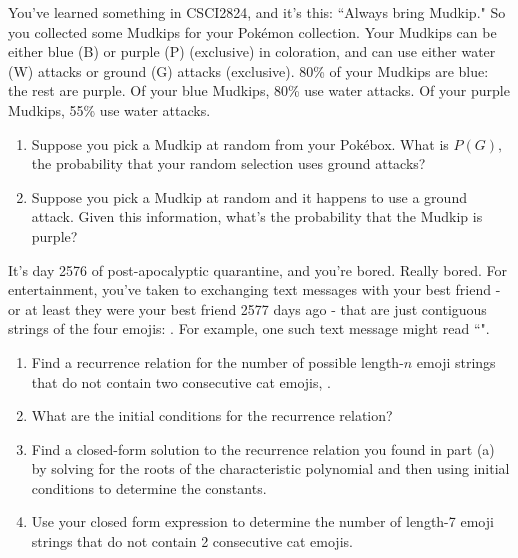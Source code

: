 \documentclass[11pt]{amsart}
\newcommand{\be}{\begin{enumerate}}
\newcommand{\ee}{\end{enumerate}}
\begin{document}
\item You've learned something in CSCI2824, and it's this: ``Always bring Mudkip."  So you collected some Mudkips for your Pok\'emon collection.  Your Mudkips can be either blue (B) or purple (P) (exclusive) in coloration, and can use either water (W) attacks or ground (G) attacks (exclusive).  80\% of your Mudkips are blue: the rest are purple.  Of your blue Mudkips, 80\% use water attacks.  Of your purple Mudkips, 55\% use water attacks.
\be
\item Suppose you pick a Mudkip at random from your Pok\'ebox.  What is $P(G),$ the probability that your random selection uses ground attacks?
\item Suppose you pick a Mudkip at random and it happens to use a ground attack.  Given this information, what's the probability that the Mudkip is purple?
\ee
	\begin{sol}
	\end{sol}

\item It's day 2576 of post-apocalyptic quarantine, and you're bored.  Really bored.  For entertainment, you've taken to exchanging text messages with your best friend - or at least they were your best friend 2577 days ago - that are just contiguous strings of the four emojis: {\LARGE \Winkey \Innocey \Cat \Coffeecup}.  For example, one such text message might read ``\Cat \Coffeecup \Winkey \Coffeecup \Innocey \Cat".
\be
\item Find a recurrence relation for the number of possible length-$n$ emoji strings that do not contain two consecutive cat emojis, {\LARGE\Cat\Cat}.
\item What are the initial conditions for the recurrence relation?
\item Find a closed-form solution to the recurrence relation you found in part (a) by solving for the roots of the characteristic polynomial and then using initial conditions to determine the constants.
\item Use your closed form expression to determine the number of length-7 emoji strings that do not contain 2 consecutive cat emojis.
\ee
\end{document}
